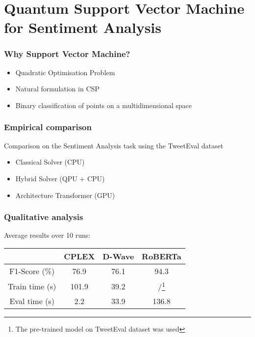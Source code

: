 \documentclass[aspectratio=169]{beamer}
\begin{document}
\section{Quantum Support Vector Machine for Sentiment Analysis}

\begin{frame}\frametitle{Why Support Vector Machine?}

    \begin{itemize}
        \item Quadratic Optimisation Problem
        \item Natural formulation in CSP
        \item Binary classification of points on a multidimensional space
    \end{itemize}

\end{frame}

\begin{frame}\frametitle{Empirical comparison}

    Comparison on the Sentiment Analysis task using the TweetEval dataset

    \begin{itemize}
        \item Classical Solver (CPU)
        \item Hybrid Solver (QPU + CPU)
        \item Architecture Transformer (GPU)
    \end{itemize}

\end{frame}

\begin{frame}\frametitle{Qualitative analysis}

    Average results over 10 runs:

    \begin{table}
        \centering
        \begin{tabular}{c|c|c|c}
            & CPLEX & D-Wave & RoBERTa \\ \hline
            F1-Score (\%) & 76.9 & 76.1 & 94.3 \\ \hline
            Train time (s) & 101.9 & 39.2 & /\footnote{The pre-trained model on TweetEval dataset was used} \\ \hline
            Eval time (s) & 2.2 & 33.9 & 136.8
        \end{tabular}
    \end{table}

\end{frame}
\end{document}
